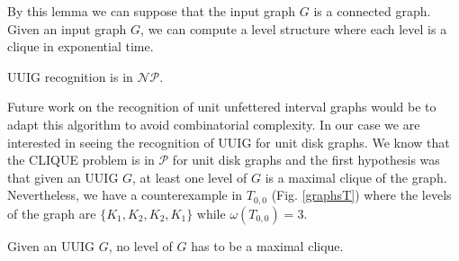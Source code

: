 By this lemma we can suppose that the input graph $G$ is a connected graph. Given an input graph $G$, we can compute a level structure where each level is a clique in exponential time.

\begin{theorem}
  UUIG recognition is in $\mathcal{NP}$.
\end{theorem}


Future work on the recognition of unit unfettered interval graphs would be to adapt this algorithm to avoid combinatorial complexity. In our case we are interested in seeing the recognition of UUIG for unit disk graphs. We know that the CLIQUE problem is in $\mathcal{P}$ for unit disk graphs and the first hypothesis was that given an UUIG $G$, at least one level of $G$ is a maximal clique of the graph. Nevertheless, we have a counterexample in $T_{0,0}$ (Fig. \ref{graphsT}) where the levels of the graph are $\{K_1, K_2, K_2, K_1\}$ while $\omega(T_{0,0}) = 3$.

\begin{obs}
  Given an UUIG $G$, no level of $G$ has to be a maximal clique.
\end{obs}
